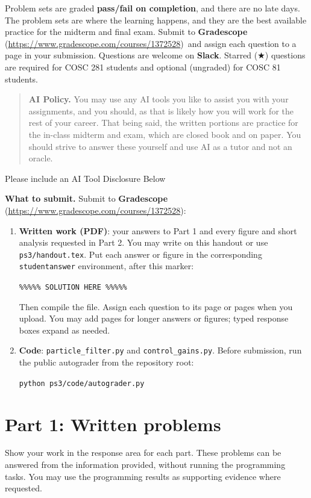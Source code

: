 \documentclass[11pt]{article}
\title{\textbf{\coursenumber:} #1}
\author{\textbf{Due} #2\\
  }
\date{}
\newcommand{\dgreen}[1]{\textcolor{DartmouthGreen}{#1}}
\newcommand{\dgbf}[1]{\textbf{\dgreen{#1}}}      %
\newcommand{\gradescopelink}{\textbf{Gradescope} (\url{https://www.gradescope.com/courses/1372528})}
\providecommand{\tightlist}{\setlength{\itemsep}{0pt}\setlength{\parskip}{0pt}}
\DeclareRobustCommand{\callout}[2][gray!10]{%
  \begin{tcolorbox}[left=8pt, arc=0pt, outer arc=0pt,
                    colframe=#1, colback=#1, coltext=black]#2\end{tcolorbox}}
\newcommand{\coursenotice}{%
  \callout{Problem sets are graded \textbf{pass/fail on completion}, and
  there are no late days. The problem sets are where the learning happens,
  and they are the best available practice for the midterm and final exam.
  Submit to \gradescopelink\ and assign each question to a page in your
  submission. Questions are welcome on \dgbf{Slack}. Starred ($\bigstar$)
  questions are required for COSC 281 students and optional (ungraded) for
  COSC 81 students.}}
\begin{document}
\maketitle
\coursenotice
\begin{quote}\small\textbf{AI Policy.} You may use any AI tools you like to assist you with your assignments, and you should, as that is likely how you will work for the rest of your career.
That being said, the written portions are practice for the in-class midterm and exam, which are closed book and on paper. You should strive to answer these yourself and use AI as a tutor and not an oracle.
\end{quote}

\callout{Please include an AI Tool Disclosure Below \vspace{50pt}}

\raggedbottom
\Needspace{8cm}
\textbf{What to submit.} Submit to \gradescopelink:\vspace{-10pt}
\begin{enumerate}\tightlist
\item \textbf{Written work (PDF)}: your answers to Part 1 and every figure
      and short analysis requested in Part 2. You may write on this handout or use
      \texttt{ps3/handout.tex}. Put each answer or figure in the
      corresponding \texttt{studentanswer} environment, after this marker:
      \begin{center}
      \texttt{\%\%\%\%\% SOLUTION HERE \%\%\%\%\%}
      \end{center}
      Then compile the file. Assign each question to its page or pages when you upload. You may add
      pages for longer answers or figures; typed response boxes expand as needed.
\item \textbf{Code}: \texttt{particle\_filter.py} and
      \texttt{control\_gains.py}. Before submission, run the public autograder from
      the repository root:
      \begin{center}\texttt{python ps3/code/autograder.py}\end{center}
\end{enumerate}

\clearpage
\section{Part 1: Written problems}

Show your work in the response area for each part. These problems can be
answered from the information provided, without running the programming
tasks. You may use the programming results as supporting evidence where
requested.
\end{document}
